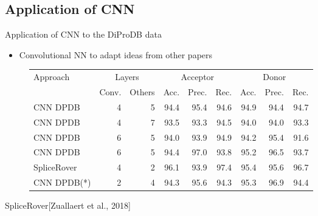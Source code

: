\documentclass[10pt]{beamer}
\begin{document}
\subsection{Application of CNN}
\begin{frame}{Application of CNN to the DiProDB data}
	\begin{itemize}
		\item Convolutional NN to adapt ideas from other papers
	\end{itemize}
	\pause
	\begin{figure}
		\small
		\centering
		\begingroup
		\def\arraystretch{1.2}
		\begin{tabular}{|l|r|r|r|r|r|r|r|r|}
			\hline
			Approach  & \multicolumn{2}{c}{Layers} & \multicolumn{3}{|c|}{Acceptor} & \multicolumn{3}{c|}{Donor} \\
			\cline{2-9}
			&Conv. & Others & Acc. & Prec. & Rec. & Acc. & Prec. & Rec. \\
			\hline
			CNN DPDB & 4 & 5 & 94.4 & 95.4 & 94.6 & 94.9 & 94.4 & 94.7 \\
			CNN DPDB & 4 & 7 & 93.5 & 93.3 & 94.5 & 94.0 & 94.0 & 93.3 \\
			CNN DPDB & 6 & 5 & 94.0 & 93.9 & 94.9 & 94.2 & 95.4 & 91.6 \\
			CNN DPDB & 6 & 5 & 94.4 & 97.0 & 93.8 & 95.2 & 96.5 & 93.7 \\
			SpliceRover & 4 & 2 & 96.1 & 93.9 & 97.4 & 95.4 & 95.6 & 96.7 \\
			CNN DPDB(*) & 2 & 4 & 94.3 & 95.6 & 94.3 & 95.3 & 96.9 & 94.4 \\
			
			\hline  
		\end{tabular}
		\endgroup
	\end{figure}
	SpliceRover[Zuallaert et al., 2018]

\end{frame}
\end{document}
